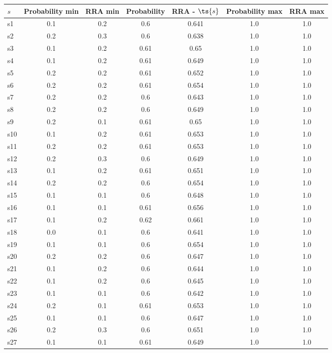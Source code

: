 \documentclass{article}
\begin{document}
\noindent\begin{tabular}{|l|c|c|c|c|c|c|}
\hline
$s$& Probability min & RRA min & Probability & RRA - $\ts{s}$ & Probability max & RRA max\\
\hline
s1 &0.1 & 0.2 & 0.6 & 0.641 & 1.0 & 1.0\\
\hline
s2 &0.2 & 0.3 & 0.6 & 0.638 & 1.0 & 1.0\\
\hline
s3 &0.1 & 0.2 & 0.61 & 0.65 & 1.0 & 1.0\\
\hline
s4 &0.1 & 0.2 & 0.61 & 0.649 & 1.0 & 1.0\\
\hline
s5 &0.2 & 0.2 & 0.61 & 0.652 & 1.0 & 1.0\\
\hline
s6 &0.2 & 0.2 & 0.61 & 0.654 & 1.0 & 1.0\\
\hline
s7 &0.2 & 0.2 & 0.6 & 0.643 & 1.0 & 1.0\\
\hline
s8 &0.2 & 0.2 & 0.6 & 0.649 & 1.0 & 1.0\\
\hline
s9 &0.2 & 0.1 & 0.61 & 0.65 & 1.0 & 1.0\\
\hline
s10 &0.1 & 0.2 & 0.61 & 0.653 & 1.0 & 1.0\\
\hline
s11 &0.2 & 0.2 & 0.61 & 0.653 & 1.0 & 1.0\\
\hline
s12 &0.2 & 0.3 & 0.6 & 0.649 & 1.0 & 1.0\\
\hline
s13 &0.1 & 0.2 & 0.61 & 0.651 & 1.0 & 1.0\\
\hline
s14 &0.2 & 0.2 & 0.6 & 0.654 & 1.0 & 1.0\\
\hline
s15 &0.1 & 0.1 & 0.6 & 0.648 & 1.0 & 1.0\\
\hline
s16 &0.1 & 0.1 & 0.61 & 0.656 & 1.0 & 1.0\\
\hline
s17 &0.1 & 0.2 & 0.62 & 0.661 & 1.0 & 1.0\\
\hline
s18 &0.0 & 0.1 & 0.6 & 0.641 & 1.0 & 1.0\\
\hline
s19 &0.1 & 0.1 & 0.6 & 0.654 & 1.0 & 1.0\\
\hline
s20 &0.2 & 0.2 & 0.6 & 0.647 & 1.0 & 1.0\\
\hline
s21 &0.1 & 0.2 & 0.6 & 0.644 & 1.0 & 1.0\\
\hline
s22 &0.1 & 0.2 & 0.6 & 0.645 & 1.0 & 1.0\\
\hline
s23 &0.1 & 0.1 & 0.6 & 0.642 & 1.0 & 1.0\\
\hline
s24 &0.2 & 0.1 & 0.61 & 0.653 & 1.0 & 1.0\\
\hline
s25 &0.1 & 0.1 & 0.6 & 0.647 & 1.0 & 1.0\\
\hline
s26 &0.2 & 0.3 & 0.6 & 0.651 & 1.0 & 1.0\\
\hline
s27 &0.1 & 0.1 & 0.61 & 0.649 & 1.0 & 1.0\\

\end{tabular}
\end{document}
